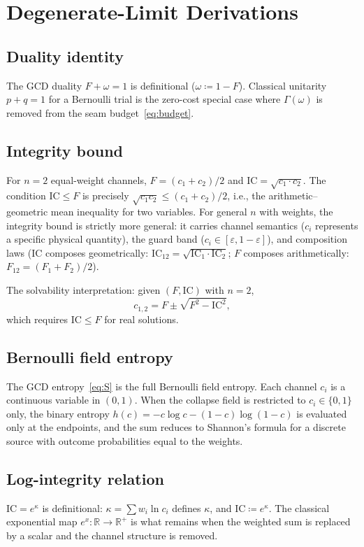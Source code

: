 \documentclass[
  aps,
  prd,
  twocolumn,
  superscriptaddress,
  nofootinbib,
  floatfix
]{revtex4-2}
\newcommand{\Gam}{\Gamma}
\newcommand{\eps}{\varepsilon}
\newcommand{\beq}{\begin{equation}}
\newcommand{\eeq}{\end{equation}}
\newcommand{\IC}{\mathrm{IC}}
\begin{document}

\section{Degenerate-Limit Derivations}\label{app:degenerate}

\subsection{Duality identity}

The GCD duality $F + \omega = 1$ is definitional ($\omega \coloneqq
1 - F$).  Classical unitarity $p + q = 1$ for a Bernoulli trial is
the zero-cost special case where $\Gam(\omega)$ is removed from the
seam budget~\eqref{eq:budget}.

\subsection{Integrity bound}

For $n = 2$ equal-weight channels, $F = (c_1 + c_2)/2$ and
$\IC = \sqrt{c_1 \cdot c_2}$.  The condition $\IC \leq F$ is
precisely $\sqrt{c_1 c_2} \leq (c_1 + c_2)/2$, i.e., the
arithmetic--geometric mean inequality for two variables.  For
general $n$ with weights, the integrity bound is strictly more
general: it carries channel semantics ($c_i$ represents a specific
physical quantity), the guard band ($c_i \in [\eps, 1-\eps]$), and
composition laws ($\IC$ composes geometrically:
$\IC_{12} = \sqrt{\IC_1 \cdot \IC_2}$; $F$ composes arithmetically:
$F_{12} = (F_1 + F_2)/2$).

The solvability interpretation: given $(F, \IC)$ with $n = 2$,
\beq
  c_{1,2} = F \pm \sqrt{F^2 - \IC^2},
\eeq
which requires $\IC \leq F$ for real solutions.

\subsection{Bernoulli field entropy}

The GCD entropy~\eqref{eq:S} is the full Bernoulli field entropy.
Each channel $c_i$ is a continuous variable in $(0, 1)$.  When the
collapse field is restricted to $c_i \in \{0, 1\}$ only, the binary
entropy $h(c) = -c\log c - (1-c)\log(1-c)$ is evaluated only at the
endpoints, and the sum reduces to Shannon's formula for a discrete
source with outcome probabilities equal to the weights.

\subsection{Log-integrity relation}

$\IC = e^\kappa$ is definitional: $\kappa = \sum w_i \ln c_i$
defines $\kappa$, and $\IC \coloneqq e^\kappa$.  The classical
exponential map $e^x: \mathbb{R} \to \mathbb{R}^+$ is what remains
when the weighted sum is replaced by a scalar and the channel
structure is removed.



\end{document}
